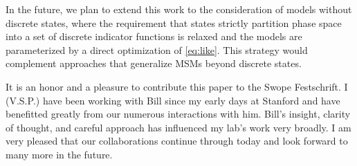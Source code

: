 \documentclass[journal=jpcbfk, layout=traditional, manuscript=article]{achemso}
\begin{document}
In the future, we plan to extend this work to the consideration of models without discrete states, where the requirement that states strictly partition phase space into a set of discrete indicator functions is relaxed and the models are parameterized by a direct optimization of \cref{eq:like}. This strategy would complement approaches that generalize MSMs beyond discrete states\cite{chiang2010markov, Noe2013Variational}.

\begin{acknowledgement}
It is an honor and a pleasure to contribute this paper to the Swope Festschrift.  I (V.S.P.) have been working with Bill since my early days at Stanford and have benefitted greatly from our numerous interactions with him.  Bill's insight, clarity of thought, and careful approach has influenced my lab's work very broadly.  I am very pleased that our collaborations continue through today and look forward to many more in the future.
\end{acknowledgement}


\end{document}

